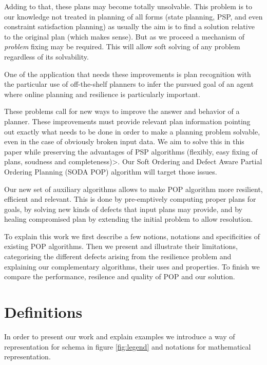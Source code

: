 \documentclass[]{article}
\begin{document}
Adding to that, these plans may become totally unsolvable. This problem
is to our knowledge not treated in planning of all forms (state
planning, PSP, and even constraint satisfaction planning) as usually the
aim is to find a solution relative to the original plan (which makes
sense). But as we proceed a mechanism of \emph{problem} fixing may be
required. This will allow soft solving of any problem regardless of its
solvability.

One of the application that needs these improvements is plan recognition
with the particular use of off-the-shelf planners to infer the pursued
goal of an agent where online planning and resilience is particularly
important.

These problems call for new ways to improve the answer and behavior of a
planner. These improvements must provide relevant plan information
pointing out exactly what needs to be done in order to make a planning
problem solvable, even in the case of obviously broken input data. We
aim to solve this in this paper while preserving the advantages of PSP
algorithms (flexibly, easy fixing of plans, soudness and
completeness)\textgreater{}. Our Soft Ordering and Defect Aware Partial
Ordering Planning (SODA POP) algorithm will target those issues.

Our new set of auxiliary algorithms allows to make POP algorithm more
resilient, efficient and relevant. This is done by pre-emptively
computing proper plans for goals, by solving new kinds of defects that
input plans may provide, and by healing compromised plan by extending
the initial problem to allow resolution.

To explain this work we first describe a few notions, notations and
specificities of existing POP algorithms. Then we present and illustrate
their limitations, categorising the different defects arising from the
resilience problem and explaining our complementary algorithms, their
uses and properties. To finish we compare the performance, resilence and
quality of POP and our solution.

\section{Definitions}\label{definitions}

In order to present our work and explain examples we introduce a way of
representation for schema in figure \ref{fig:legend} and notations for
mathematical representation.
\end{document}
